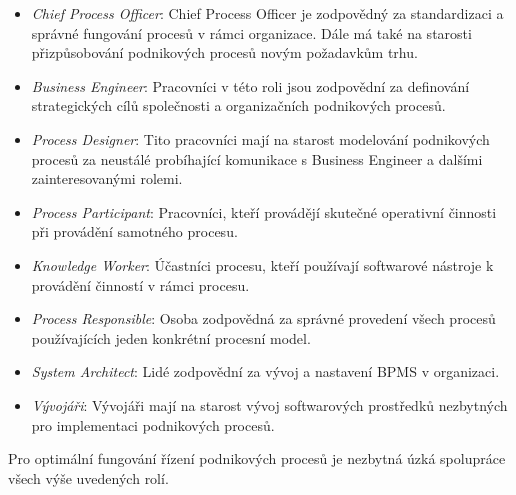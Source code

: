 \begin{itemize}
\item \textit{Chief Process Officer}: Chief Process Officer je zodpovědný za standardizaci a správné fungování procesů v rámci organizace. Dále má také na starosti přizpůsobování podnikových procesů novým požadavkům trhu.
\item \textit{Business Engineer}: Pracovníci v této roli jsou zodpovědní za definování strategických cílů společnosti a organizačních podnikových procesů.
\item \textit{Process Designer}: Tito pracovníci mají na starost modelování podnikových procesů za neustálé probíhající komunikace s Business Engineer a dalšími zainteresovanými rolemi.
\item \textit{Process Participant}: Pracovníci, kteří provádějí skutečné operativní činnosti při provádění samotného procesu.
\item \textit{Knowledge Worker}: Účastníci procesu, kteří používají softwarové nástroje k provádění činností v rámci procesu.
\item \textit{Process Responsible}: Osoba zodpovědná za správné provedení všech procesů používajících jeden konkrétní procesní model.
\item \textit{System Architect}: Lidé zodpovědní za vývoj a nastavení BPMS v organizaci.
\item \textit{Vývojáři}: Vývojáři mají na starost vývoj softwarových prostředků nezbytných pro implementaci podnikových procesů.
\end{itemize}

Pro optimální fungování řízení podnikových procesů je nezbytná úzká spolupráce všech výše uvedených rolí.
